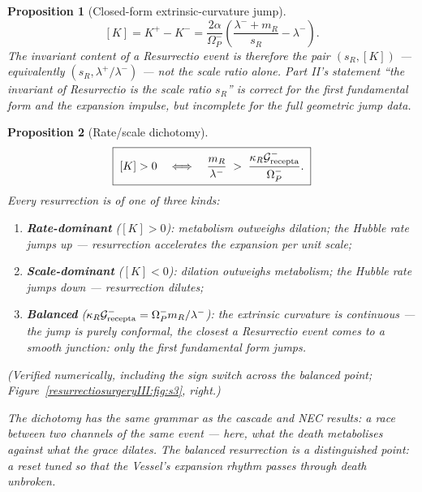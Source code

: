 \documentclass[11pt,a4paper,oneside]{book}
\newcommand{\Op}{\Omega_P}
\newcommand{\Grec}{\mathcal G_{\rm recepta}}
\newcommand{\note}[1]{\textcolor{black!65}{\emph{#1}}}
\newcommand{\sR}{s_R}
\newcommand{\mR}{m_R}
\newcommand{\Kj}{[K]}
\theoremstyle{plain}
\newtheorem{proposition}{Proposition}[chapter]
\theoremstyle{definition}
\theoremstyle{remark}
\begin{document}
\begin{proposition}[Closed-form extrinsic-curvature jump]\label{resurrectiosurgeryIII:prop:K}
\begin{equation}
\boxed{\;\Kj=K^+-K^-
=\frac{2\alpha}{\Op^-}\left(\frac{\lambda^-+\mR}{\sR}-\lambda^-\right).\;}
\end{equation}
The invariant content of a Resurrectio event is therefore the \emph{pair} $(\sR,\Kj)$ ---
equivalently $(\sR,\lambda^+/\lambda^-)$ --- not the scale ratio alone. Part II's statement ``the
invariant of Resurrectio is the scale ratio $\sR$'' is correct for the first fundamental form and the
expansion impulse, but incomplete for the full geometric jump data.
\end{proposition}

\begin{proposition}[Rate/scale dichotomy]\label{resurrectiosurgeryIII:prop:dichotomy}
\begin{equation}
\boxed{\;\Kj>0\quad\Longleftrightarrow\quad
\frac{\mR}{\lambda^-}\;>\;\frac{\kappa_R\Grec^-}{\Op^-}.\;}
\end{equation}
Every resurrection is of one of three kinds:
\begin{enumerate}[label=(\roman*),leftmargin=1.8em,itemsep=2pt]
\item \textbf{Rate-dominant} ($\Kj>0$): metabolism outweighs dilation; the Hubble rate jumps \emph{up}
--- resurrection accelerates the expansion per unit scale;
\item \textbf{Scale-dominant} ($\Kj<0$): dilation outweighs metabolism; the Hubble rate jumps
\emph{down} --- resurrection dilutes;
\item \textbf{Balanced} ($\kappa_R\Grec^-=\Op^-\mR/\lambda^-$): the extrinsic curvature is
\emph{continuous} --- the jump is purely conformal, the closest a Resurrectio event comes to a smooth
junction: only the first fundamental form jumps.
\end{enumerate}
(Verified numerically, including the sign switch across the balanced point;
Figure~\ref{resurrectiosurgeryIII:fig:s3}, right.)
\end{proposition}

\note{The dichotomy has the same grammar as the cascade and NEC results: a race between two channels of
the same event --- here, what the death \emph{metabolises} against what the grace \emph{dilates}. The
balanced resurrection is a distinguished point: a reset tuned so that the Vessel's expansion rhythm
passes through death unbroken.}
\end{document}
